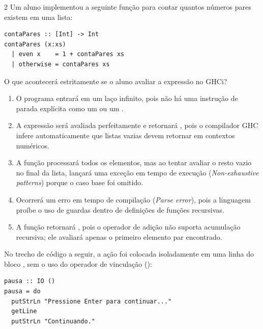 \documentclass[a4paper,10pt,brazil]{article}
\begin{document}
\begin{multicols}{2}
Um aluno implementou a seguinte função para contar quantos números pares existem em uma lista:

\begin{verbatim}
contaPares :: [Int] -> Int
contaPares (x:xs)
  | even x    = 1 + contaPares xs
  | otherwise = contaPares xs
\end{verbatim}

O que acontecerá estritamente se o aluno avaliar a expressão  no GHCi?

\begin{enumerate}
  \item O programa entrará em um laço infinito, pois não há uma instrução de parada explícita como um  ou um .

  \item A expressão será avaliada perfeitamente e retornará , pois o compilador GHC infere automaticamente que listas vazias devem retornar  em contextos numéricos.

  \item A função processará todos os elementos, mas ao tentar avaliar o resto vazio no final da lista, lançará uma exceção em tempo de execução (\emph{Non-exhaustive patterns}) porque o caso base  foi omitido.

  \item Ocorrerá um erro em tempo de compilação (\emph{Parse error}), pois a linguagem proíbe o uso de guardas dentro de definições de funções recursivas.

  \item A função retornará , pois o operador de adição não suporta acumulação recursiva; ele avaliará apenas o primeiro elemento par encontrado.


\end{enumerate}

No trecho de código a seguir, a ação  foi colocada isoladamente em uma linha do bloco , sem o uso do operador de vinculação (\haskellinline{<-}):

\begin{verbatim}
pausa :: IO ()
pausa = do
  putStrLn "Pressione Enter para continuar..."
  getLine
  putStrLn "Continuando."
\end{verbatim}


\end{multicols}
\end{document}

